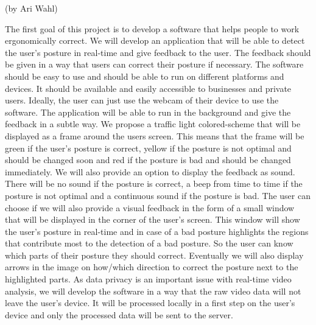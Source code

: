 (by Ari Wahl)

The first goal of this project is to develop a software that helps people to work
ergonomically correct. We will develop an application that will be able to detect the user's posture in real-time
and give feedback to the user. The feedback should be given in a way that users
can correct their posture if necessary. The software should be easy to use and should be able to run on 
different platforms and devices. It should be available and easily accessible to businesses and private users. Ideally, the user
can just use the webcam of their device to use the software. The application will be able to run in the background
and give the feedback in a subtle way. We propose a traffic light colored-scheme that will be displayed as a frame
around the users screen. This means that the frame will be green if the user's posture is correct, yellow if the posture is not optimal 
and should be changed soon and red if the posture is bad and should be changed immediately. 
We will also provide an option to display the feedback as sound. There will be no sound if the posture is correct, a
beep from time to time if the posture is not optimal and a continuous sound if the posture is bad. 
The user can choose if we will also provide a visual feedback in the form of a small window that will be displayed in the corner of the user's screen.
This window will show the user's posture in real-time and in case of a bad posture highlights the regions that contribute most to the detection of a bad posture.
So the user can know which parts of their posture they should correct. Eventually we will also display arrows
in the image on how/which direction to correct the posture next to the highlighted parts.
As data privacy is an important issue with real-time video analysis, we will develop the software in a way that the raw video data
will not leave the user's device. It will be processed locally in a first step on the user's device and only the processed data will be sent to the server.

